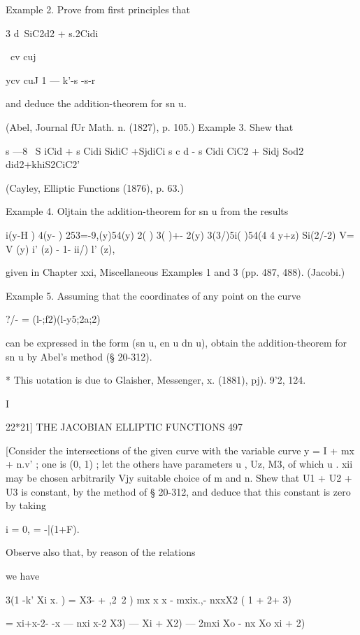 Example 2. Prove from first principles that 

3 d\ SiC2d2 + s.2Cidi\  



\ cv cuj 



ycv cuJ 1 — k'-s -s-r 

and deduce the addition-theorem for sn u. 

(Abel, Journal fUr Math. n. (1827), p. 105.) 
Example 3. Shew that 

s —8  \  S iCid + s Cidi   SidiC +SjdiCi 
s c d - s Cidi CiC2 + Sidj Sod2 did2+khiS2CiC2' 

(Cayley, Elliptic Functions (1876), p. 63.) 

Example 4. Oljtain the addition-theorem for sn u from the results 

 i(y-H ) 4(y- ) 253=-9,(y)54(y) 2( ) 3( )+- 2(y) 3(3/)5i( )54(4 
 4  y+z) Si(2/-2) V= V (y)  i' (z) -  1- ii/)  l' (z), 

given in Chapter xxi, Miscellaneous Examples 1 and 3 (pp. 487, 488). (Jacobi.) 

Example 5. Assuming that the coordinates of any point on the curve 

?/- = (l-;f2)(l-y5;2a;2) 

can be expressed in the form (sn u, en u dn u), obtain the addition-theorem for sn u by 
Abel's method (§ 20-312). 

* This uotation is due to Glaisher, Messenger, x. (1881), pj). 9'2, 124. 



I 



22*21] THE JACOBIAN ELLIPTIC FUNCTIONS 497 

[Consider the intersections of the given curve with the variable curve y = I + mx + n.v'  ; 
one is (0, 1) ; let the others have parameters u , Uz, M3, of which u  . xii may be chosen 
arbitrarily Vjy suitable choice of m and n. Shew that U1 + U2 + U3 is constant, by the 
method of § 20-312, and deduce that this constant is zero by taking 

 i = 0,  = -|(1+F). 

Observe also that, by reason of the relations 

we have 

 3(1 -k' Xi x. ) = X3-  +  ,2\  2 )  mx x x - mxix.,- nxxX2 ( 1 +  2+ 3) 

=  xi+x-2- -x  — nxi x-2 X3) —  Xi + X2) — 2mxi Xo - nx  Xo  xi +  2) 

